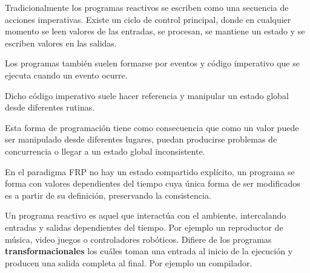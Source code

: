 
Tradicionalmente los programas reactivos
se escriben como una secuencia de acciones imperativas.
Existe un ciclo de control principal, donde en cualquier
momento se leen valores de las entradas, se procesan,
se mantiene un estado y se escriben valores en las salidas.

Los programas también suelen formarse por eventos
y código imperativo que se ejecuta cuando un evento ocurre.

Dicho código imperativo suele hacer referencia y manipular
un estado global desde diferentes rutinas.

Esta forma de programación tiene como consecuencia que
como un valor puede ser manipulado desde diferentes lugares,
puedan producirse problemas de concurrencia o llegar a un
estado global inconsistente.

En el paradigma FRP no hay un estado compartido explícito,
un programa se forma con valores dependientes del tiempo
cuya única forma de ser modificados
es a partir de su definición, preservando la consistencia.

Un programa reactivo es aquel que interactúa con el ambiente,
intercalando entradas y salidas dependientes del tiempo.
Por ejemplo un reproductor de música, video juegos o
controladores robóticos.
Difiere de los programas \textbf{transformacionales} los cuáles
toman una entrada al inicio de la ejecución y producen una salida
completa al final. Por ejemplo un compilador.

